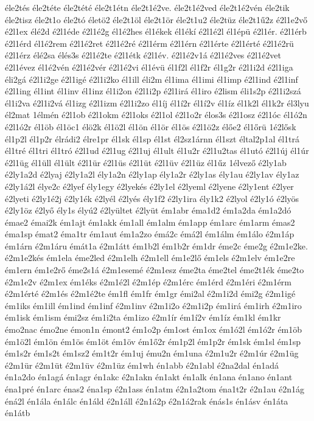 {éle2tés
éle2téte
éle2tété
éle2t1étn
éle2t1é2ve.
éle2t1é2ved
éle2t1é2vén
éle2tik
éle2tisz
éle2t1o
éle2tó
életö2
éle2t1öl
éle2t1ör
éle2t1u2
éle2tüz
éle2t1ű2z
é2l1e2vő
é2l1ex
élé2d
é2l1éde
é2l1é2g
él1é2hes
él1ékek
él1ékí
é2l1é2l
él1épü
é2l1ér.
é2l1érb
é2l1érd
él1é2rem
é2l1é2ret
é2l1é2ré
é2l1érm
é2l1érn
é2l1érte
é2l1érté
é2l1é2rü
é2l1érz
élé2sa
élés3s
é2l1é2te
é2l1étk
é2l1év.
é2l1é2v1á
é2l1é2ves
é2l1é2vet
é2l1évez
él1é2vén
é2l1é2vér
é2l1é2vi
él1évü
él1f2l
él1f2r
él1g2r
é2l1i2d
é2l1iga
éli2gá
é2l1i2ge
é2l1igé
é2l1i2ko
él1ill
éli2m
él1ima
él1imi
él1imp
é2l1ind
é2l1inf
é2l1ing
él1int
él1inv
él1inz
él1i2on
é2l1i2p
é2l1irá
él1iro
é2lism
éli1s2p
é2l1i2szá
él1i2va
é2l1i2vá
él1izg
é2l1izm
é2l1i2zo
él1íj
él1í2r
él1í2v
él1íz
él1k2l
él1k2r
él3lyu
él2mat
1élmén
é2l1ob
é2l1okm
é2l1oks
é2l1ol
é2l1o2r
élos3s
é2l1osz
é2l1óc
él1ó2n
é2l1ó2r
él1öb
él1öc1
élö2k
él1ö2l
él1ön
él1ör
él1ös
é2l1ö2z
élőe2
él1őrü
1é2lősk
él1p2l
él1p2r
élrádi2
élre1pr
él1sk
él1sp
él1st
él2sz1árnn
él1szt
éltal2p1al
él1trá
él1tré
él1tri
él1tró
é2l1ud
é2l1ug
é2l1uj
él1ult
él1u2r
é2l1u2tas
él1utó
é2l1új
él1úr
é2l1üg
él1üll
él1ült
é2l1ür
é2l1üs
é2l1üt
é2l1üv
é2l1üz
él1űz
1élvező
é2ly1ab
é2ly1a2d
é2lyaj
é2ly1a2l
ély1a2n
é2ly1ap
ély1a2r
é2ly1as
ély1au
é2ly1av
ély1az
é2ly1á2l
élye2c
é2lyef
ély1egy
é2lyekés
é2ly1el
é2lyeml
é2lyene
é2ly1ent
é2lyer
é2lyeti
é2ly1é2j
é2ly1ék
é2lyél
é2lyés
ély1f2
é2ly1ira
ély1k2
é2lyol
é2ly1ó
é2lyös
é2ly1öz
é2lyő
ély1s
élyú2
é2lyültet
é2lyüt
ém1abr
éma1d2
ém1a2da
ém1a2dó
émae2
émai2k
ém1ajt
ém1akk
ém1all
ém1alm
ém1app
ém1arc
ém1arm
émas2
éma1sp
émat2
éma1tr
ém1aut
ém1a2zo
émá2c
émá2l
ém1álm
ém1álo
é2m1áp
ém1árn
é2m1áru
émát1a
é2m1átt
ém1b2l
ém1b2r
ém1dr
éme2c
éme2g
é2m1e2ke.
é2m1e2kés
ém1ela
éme2led
é2m1elh
é2m1ell
ém1e2lő
ém1els
é2m1elv
ém1e2re
ém1ern
ém1e2rő
éme2s1á
é2m1esemé
é2m1esz
éme2ta
éme2tel
éme2t1ék
éme2to
é2m1e2v
é2m1ex
ém1éks
é2m1é2l
é2m1ép
é2m1érc
ém1érd
é2m1éri
é2m1érm
é2m1érté
é2m1és
é2m1é2te
ém1fl
ém1fr
ém1gr
émi2al
é2m1i2d
émi2g
é2m1igé
ém1iks
ém1ill
ém1ind
ém1inf
é2m1inv
é2m1i2o
é2m1i2p
ém1irá
ém1irh
é2m1iro
ém1isk
ém1ism
émi2sz
ém1i2ta
ém1izo
é2m1ír
ém1í2v
ém1íz
ém1kl
ém1kr
émo2nac
émo2ne
émon1n
émont2
ém1o2p
ém1ost
ém1ox
ém1ó2l
ém1ó2r
ém1öb
ém1ö2l
ém1ön
ém1ös
ém1öt
ém1öv
ém1ő2r
ém1p2l
ém1p2r
ém1sk
ém1sl
ém1sp
ém1s2r
ém1s2t
ém1sz2
ém1t2r
ém1uj
ému2n
ém1una
é2m1u2r
é2m1úr
é2m1üg
é2m1ür
é2m1üt
é2m1üv
é2m1üz
ém1wh
én1abb
é2n1abl
é2na2dal
én1adá
én1a2do
én1agá
én1agr
én1akc
é2n1akn
én1akt
én1alk
én1ana
én1ano
én1ant
éna1pré
én1arc
énas2
éna1sp
é2n1ass
én1atm
é2n1a2tom
éna1t2r
é2n1au
é2n1ág
éná2l
én1ála
én1álc
én1áld
é2n1áll
é2n1á2p
é2n1á2rak
énás1s
én1ásv
én1áta
én1átb
}
